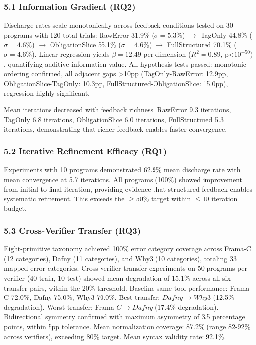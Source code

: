 
\subsubsection{5.1 Information Gradient (RQ2)}

Discharge rates scale monotonically across feedback conditions tested on 30 programs with 120 total trials: RawError 31.9\% ($\sigma =5.3$\%) $\rightarrow$ TagOnly 44.8\% ($\sigma =4.6$\%) $\rightarrow$ ObligationSlice 55.1\% ($\sigma =4.6$\%) $\rightarrow$ FullStructured 70.1\% ($\sigma =4.6$\%). Linear regression yields $\beta =12.49$ per dimension ($R^{2}=0.89$, p<$10^{-50})$, quantifying additive information value. All hypothesis tests passed: monotonic ordering confirmed, all adjacent gaps >10pp (TagOnly-RawError: 12.9pp, ObligationSlice-TagOnly: 10.3pp, FullStructured-ObligationSlice: 15.0pp), regression highly significant.

Mean iterations decreased with feedback richness: RawError 9.3 iterations, TagOnly 6.8 iterations, ObligationSlice 6.0 iterations, FullStructured 5.3 iterations, demonstrating that richer feedback enables faster convergence.

\subsubsection{5.2 Iterative Refinement Efficacy (RQ1)}

Experiments with 10 programs demonstrated 62.9\% mean discharge rate with mean convergence at 5.7 iterations. All programs (100\%) showed improvement from initial to final iteration, providing evidence that structured feedback enables systematic refinement. This exceeds the $\geq 50$\% target within $\leq 10$ iteration budget.

\subsubsection{5.3 Cross-Verifier Transfer (RQ3)}

Eight-primitive taxonomy achieved 100\% error category coverage across Frama-C (12 categories), Dafny (11 categories), and Why3 (10 categories), totaling 33 mapped error categories. Cross-verifier transfer experiments on 50 programs per verifier (40 train, 10 test) showed mean degradation of 15.1\% across all six transfer pairs, within the 20\% threshold. Baseline same-tool performance: Frama-C 72.0\%, Dafny 75.0\%, Why3 70.0\%. Best transfer: $Dafny\rightarrow Why3$ (12.5\% degradation). Worst transfer: Frama-$C\rightarrow Dafny$ (17.4\% degradation). Bidirectional symmetry confirmed with maximum asymmetry of 3.5 percentage points, within 5pp tolerance. Mean normalization coverage: 87.2\% (range 82-92\% across verifiers), exceeding 80\% target. Mean syntax validity rate: 92.1\%.

